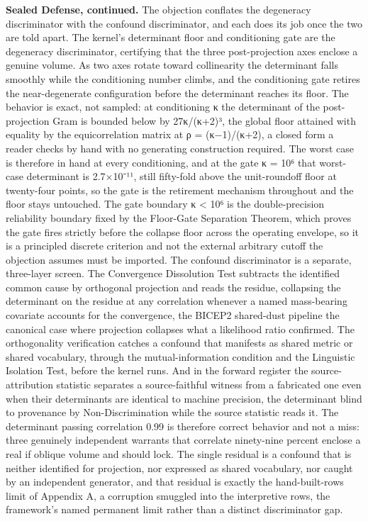 \documentclass[10pt,twocolumn]{article}
\begin{document}
\textbf{Sealed Defense, continued.} The objection conflates the
degeneracy discriminator with the confound discriminator, and each does
its job once the two are told apart. The kernel's determinant floor and
conditioning gate are the degeneracy discriminator, certifying that the
three post-projection axes enclose a genuine volume. As two axes rotate
toward collinearity the determinant falls smoothly while the
conditioning number climbs, and the conditioning gate retires the
near-degenerate configuration before the determinant reaches its floor.
The behavior is exact, not sampled: at conditioning κ the determinant of
the post-projection Gram is bounded below by 27κ/(κ+2)³, the global
floor attained with equality by the equicorrelation matrix at ρ =
(κ−1)/(κ+2), a closed form a reader checks by hand with no generating
construction required. The worst case is therefore in hand at every
conditioning, and at the gate κ = 10⁶ that worst-case determinant is
2.7×10⁻¹¹, still fifty-fold above the unit-roundoff floor at twenty-four
points, so the gate is the retirement mechanism throughout and the floor
stays untouched. The gate boundary κ \textless{} 10⁶ is the
double-precision reliability boundary fixed by the Floor-Gate Separation
Theorem, which proves the gate fires strictly before the collapse floor
across the operating envelope, so it is a principled discrete criterion
and not the external arbitrary cutoff the objection assumes must be
imported. The confound discriminator is a separate, three-layer screen.
The Convergence Dissolution Test subtracts the identified common cause
by orthogonal projection and reads the residue, collapsing the
determinant on the residue at any correlation whenever a named
mass-bearing covariate accounts for the convergence, the BICEP2
shared-dust pipeline the canonical case where projection collapses what
a likelihood ratio confirmed. The orthogonality verification catches a
confound that manifests as shared metric or shared vocabulary, through
the mutual-information condition and the Linguistic Isolation Test,
before the kernel runs. And in the forward register the
source-attribution statistic separates a source-faithful witness from a
fabricated one even when their determinants are identical to machine
precision, the determinant blind to provenance by Non-Discrimination
while the source statistic reads it. The determinant passing correlation
0.99 is therefore correct behavior and not a miss: three genuinely
independent warrants that correlate ninety-nine percent enclose a real
if oblique volume and should lock. The single residual is a confound
that is neither identified for projection, nor expressed as shared
vocabulary, nor caught by an independent generator, and that residual is
exactly the hand-built-rows limit of Appendix A, a corruption smuggled
into the interpretive rows, the framework's named permanent limit rather
than a distinct discriminator gap.
\end{document}
